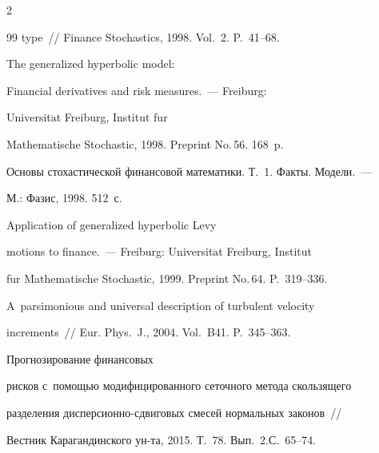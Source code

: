 \begin{multicols}{2}
{{\begin{thebibliography}{99}
type~// Finance Stochastics, 1998. Vol.~2. P.~41--68.







 The generalized hyperbolic model:


Financial derivatives and risk measures.~--- Freiburg:


Universit$\ddot{\mbox{a}}$t Freiburg, Institut f$\ddot{\mbox{u}}$r 


Mathematische Stochastic, 1998. Preprint No.\,56. 168~p.







 Основы стохастической финансовой математики. Т.~1. Факты. Модели.~--- 


М.: Фазис, 1998. 512~с.







 Application of generalized hyperbolic Levy


motions to finance.~--- Freiburg: Universit$\ddot{\mbox{a}}$t Freiburg, Institut


f$\ddot{\mbox{u}}$r Mathematische Stochastic, 1999. Preprint No.\,64. P.~319--336.









A~parsimonious and universal description of turbulent velocity


increments~// Eur. Phys.~J., 2004. Vol.~B41. P.~345--363.







 Прогнозирование финансовых


рисков с~по\-мощью модифицированного сеточного метода скользящего


разделения дис\-пер\-си\-он\-но-сдви\-го\-вых смесей нормальных законов~//


Вестник Карагандинского ун-та, 2015. Т.~78. Вып.~2.\linebreak С.~65--74.






\end{thebibliography}}}
\end{multicols}

